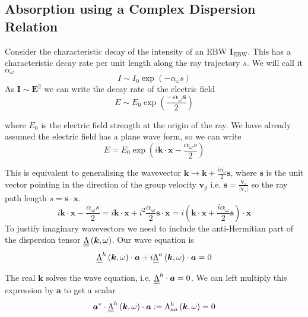 \subsection{Absorption using a Complex Dispersion Relation}
Consider the characteristic decay of the intensity of an EBW $\bm{I}_{\text{EBW}}$. This has a characteristic decay rate per unit length along the ray trajectory $s$. We will call it $\alpha_{\omega}$
\begin{equation}
	I \sim I_0 \exp \left(-\alpha_{\omega} s \right)
\end{equation}
As $\bm{I} \sim \bm{E}^2$ we can write the decay rate of the electric field
\begin{equation}
	E \sim E_0 \exp \left( \frac{-\alpha_{\omega} \bm{s}}{2} \right)
\end{equation}

where $E_0$ is the electric field strength at the origin of the ray. We have already assumed the electric field has a plane wave form, so we can write
\begin{equation}
	E = E_0 \exp \left( i \bm{k} \cdot \bm{x} - \frac{\alpha_{\omega} s}{2} \right)
\end{equation}

This is equivalent to generalising the wavevector $\bm{k} \rightarrow \bm{k} + \frac{i \alpha_{\omega}}{2} \bm{s}$, where $\bm{s}$ is the unit vector pointing in the direction of the group velocity $\bm{v}_g$ i.e. $\bm{s} = \frac{\bm{v}_s}{|\bm{v}_s|}$ so the ray path length $s=\bm{s} \cdot \bm{x}$.
\begin{equation}
	i \bm{k} \cdot \bm{x} - \frac{\alpha_{\omega} s}{2} = i \bm{k} \cdot \bm{x} + i^2 \frac{\alpha_{\omega}}{2}\bm{s} \cdot \bm{x} = i \left(\bm{k} \cdot \bm{x} + \frac{i \alpha_{\omega}}{2} \bm{s}\right) \cdot \bm{x}
\end{equation}
To justify imaginary wavevectors we need to include the anti-Hermitian part of the dispersion tensor $\underline{\underline{\Lambda}} \left( \bm{k}, \omega \right)$. Our wave equation is
\begin{equation}
	\underline{\underline{\Lambda}}^h \left( \bm{k}, \omega \right) \cdot \bm{a} + i \underline{\underline{\Lambda}}^a \left( \bm{k}, \omega \right) \cdot \bm{a} = 0
\end{equation}

The real $\bm{k}$ solves the wave equation, i.e. $\underline{\underline{\Lambda}}^h \cdot \bm{a} = 0$. We can left multiply this expression by $\bm{a}$ to get a scalar
\begin{equation}\label{real_k_lambda_h}
	\bm{a}^{*} \cdot \underline{\underline{\Lambda}}^h \left( \bm{k}, \omega \right) \cdot \bm{a} := \Lambda_{aa}^h \left( \bm{k}, \omega \right) = 0
\end{equation}

